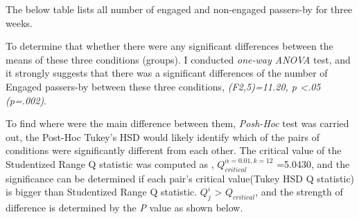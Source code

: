 The below table lists all number of engaged and non-engaged passers-by for three weeks.


\begin{table}[H]
\caption{Number of engaged passers-by in three weeks}
\label{tab:engagedofthreeweeks}
\centering
{}
\end{table}

To determine that whether there were any significant differences between the means of these three conditions (groups). I conducted \emph{one-way ANOVA} test, and it strongly suggests that there was a significant differences of the number of Engaged passers-by between these three conditions,
 \emph{(F2,5)=11.20, p <.05 (p=.002)}.

To find where were the main difference between them, \emph{Posh-Hoc} test was carried out, the Post-Hoc Tukey’s HSD would likely identify which of the pairs of conditions were significantly different from each other. The critical value of the Studentized Range Q statistic was computed as , ${Q}_{critical}^{\alpha=0.01,k=12}$ =5.0430, and the significance can be determined if each pair’s critical value(Tukey HSD Q statistic) is bigger than Studentized Range Q statistic. ${Q}_{j}^{i }$ > ${Q}_{critical}$, and the strength of difference is determined by the \emph{P} value as shown below.



\begin{table}[H]
\caption{Post-Hoc Tukey’s HSD}
\label{tab:engage-non-posthoctukey}
\centering
{}
\end{table}

